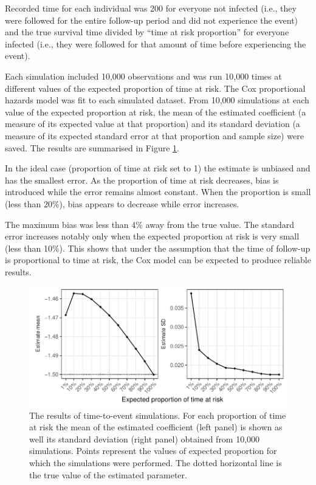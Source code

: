 Recorded time for each individual was 200 for everyone not infected (i.e., they were followed for the entire follow-up period and did not experience the event) and the true survival time divided by ``time at risk proportion'' for everyone infected (i.e., they were followed for that amount of time before experiencing the event).

Each simulation included 10,000 observations and was run 10,000 times at different values of the expected proportion of time at risk. The Cox proportional hazards model was fit to each simulated dataset. From 10,000 simulations at each value of the expected proportion at risk, the mean of the estimated coefficient (a measure of its expected value at that proportion) and its standard deviation (a measure of its expected standard error at that proportion and sample size) were saved. The results are summarised in Figure \ref{CoxSimResults}.

In the ideal case (proportion of time at risk set to 1) the estimate is unbiased and has the smallest error. As the proportion of time at risk decreases, bias is introduced while the error remains almost constant. When the proportion is small (less than 20\%), bias appears to decrease while error increases.

The maximum bias was less than 4\% away from the true value. The standard error increases notably only when the expected proportion at risk is very small (less than 10\%). This shows that under the assumption that the time of follow-up is proportional to time at risk, the Cox model can be expected to produce reliable results.

\begin{figure}[htp]
	\centering
	\includegraphics[width=1\textwidth]{../cox-tarprop-plot/risk.pdf}
	\caption{
	The results of time-to-event simulations. For each proportion of time at risk the mean of the estimated coefficient (left panel) is shown as well its standard deviation (right panel) obtained from 10,000 simulations. Points represent the values of expected proportion for which the simulations were performed. The dotted horizontal line is the true value of the estimated parameter.
	}
	\label{CoxSimResults}
\end{figure}

